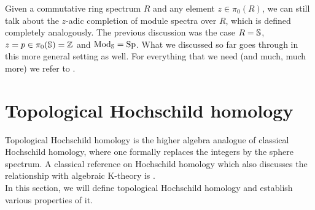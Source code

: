 Given a commutative ring spectrum $R$ and any element $z\in\pi_0(R)$, we can still talk about the $z$-adic completion of module spectra over $R$, which is defined completely analogously. The previous discussion was the case $R=\S$, $z=p\in\pi_0(\S)=\Z$ and $\Mod_\S=\Sp$. What we discussed so far goes through in this more general setting as well. For everything that we need (and much, much more) we refer to \cite[Section~7.3]{SAG}.







\section{Topological Hochschild homology}\label{THH}
Topological Hochschild homology is the higher algebra analogue of classical Hochschild homology, where one formally replaces the integers by the sphere spectrum. A classical reference on Hochschild homology which also discusses the relationship with algebraic K-theory is \cite{loday2013cyclic}.\\
In this section, we will define topological Hochschild homology and establish various properties of it.

